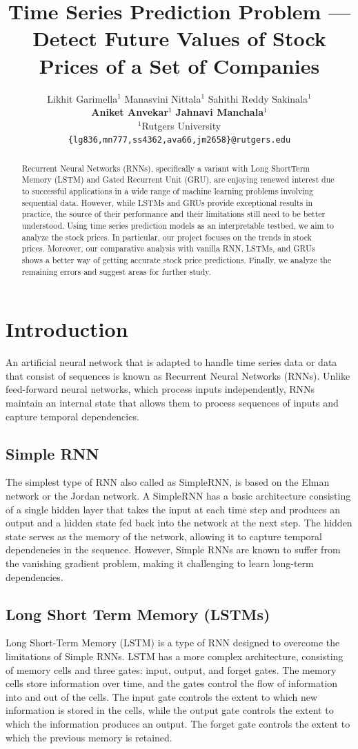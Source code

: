 \documentclass{article}
\title{Time Series Prediction Problem — Detect Future Values of Stock Prices of a Set of Companies}
\author{%
Likhit Garimella$^1$ \quad Manasvini Nittala$^1$ \quad Sahithi Reddy Sakinala$^1$ \\
\textbf{Aniket Anvekar}$^1$ \quad \textbf{Jahnavi Manchala}$^1$ \\
$^1$Rutgers University \\
\texttt{\{lg836,mn777,ss4362,ava66,jm2658\}@rutgers.edu}\\
}
\begin{document}
\maketitle

\begin{abstract}
Recurrent Neural Networks (RNNs), specifically a variant with Long ShortTerm Memory (LSTM) and Gated Recurrent Unit (GRU), are enjoying renewed interest due to successful applications in a wide range of machine learning problems involving sequential data. However, while LSTMs and GRUs provide exceptional results in practice, the source of their performance and their limitations still need to be better understood. Using time series prediction models as an interpretable testbed, we aim to analyze the stock prices. In particular, our project focuses on the trends in stock prices. Moreover, our comparative analysis with vanilla RNN, LSTMs, and GRUs shows a better way of getting accurate stock price predictions. Finally, we analyze the remaining errors and suggest areas for further study.
\end{abstract}

\section{Introduction}

An artificial neural network that is adapted to handle time series data or data that consist of sequences is known as Recurrent Neural Networks (RNNs). Unlike feed-forward neural networks, which process inputs independently, RNNs maintain an internal state that allows them to process sequences of inputs and capture temporal dependencies.

\subsection{Simple RNN}
The simplest type of RNN also called as SimpleRNN, is based on the Elman network or the Jordan network.
A SimpleRNN has a basic architecture consisting of a single hidden layer that takes the input at each time step and produces an output and a hidden state fed back into the network at the next step. The hidden state serves as the memory of the network, allowing it to capture temporal dependencies in the sequence. However, Simple RNNs are known to suffer from the vanishing gradient problem, making it challenging to learn long-term dependencies.

\subsection{Long Short Term Memory (LSTMs)}
Long Short-Term Memory (LSTM) is a type of RNN designed to overcome the limitations of Simple RNNs. LSTM has a more complex architecture, consisting of memory cells and three gates: input, output, and forget gates. The memory cells store information over time, and the gates control the flow of information into and out of the cells. The input gate controls the extent to which new information is stored in the cells, while the output gate controls the extent to which the information produces an output. The forget gate controls the extent to which the previous memory is retained.
\end{document}
